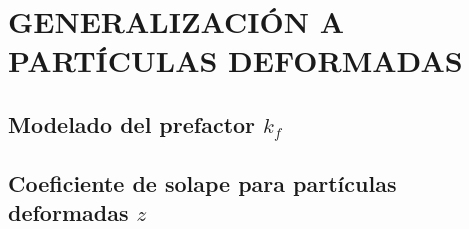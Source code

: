 \chapter{GENERALIZACIÓN A PARTÍCULAS DEFORMADAS}
\newpage
\section{Modelado del prefactor $k_f$}
\section{Coeficiente de solape para partículas deformadas $z$}

\newpage
%

% 
% 

